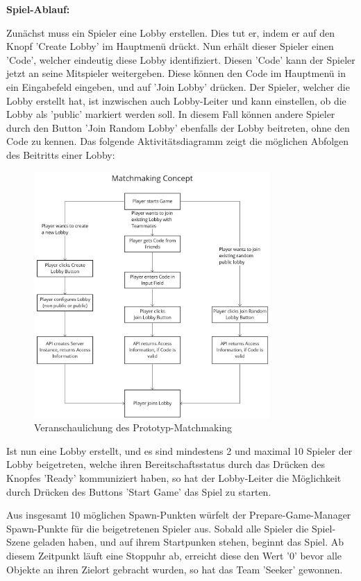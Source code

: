 \textbf{Spiel-Ablauf:}

Zunächst muss ein Spieler eine Lobby erstellen. Dies tut er, indem er auf den Knopf 'Create Lobby' im Hauptmenü drückt. Nun erhält dieser Spieler einen 'Code', welcher eindeutig diese Lobby identifiziert. Diesen 'Code' kann der Spieler jetzt an seine Mitspieler weitergeben. Diese können den Code im Hauptmenü in ein Eingabefeld eingeben, und auf 'Join Lobby' drücken. Der Spieler, welcher die Lobby erstellt hat, ist inzwischen auch Lobby-Leiter und kann einstellen, ob die Lobby als 'public' markiert werden soll. In diesem Fall können andere Spieler durch den Button 'Join Random Lobby' ebenfalls der Lobby beitreten, ohne den Code zu kennen. Das folgende Aktivitätsdiagramm zeigt die möglichen Abfolgen des Beitritts einer Lobby:

\begin{figure}[H]
	\centering
	\includegraphics[width=90mm]{images/matchmaking_concept.jpg}
	\caption[Matchmaking-Konzept Diagramm]{Veranschaulichung des Prototyp-Matchmaking}
	\label{pic:matchmaking_concept}
\end{figure}

Ist nun eine Lobby erstellt, und es sind mindestens 2 und maximal 10 Spieler der Lobby beigetreten, welche ihren Bereitschaftsstatus durch das Drücken des Knopfes 'Ready' kommuniziert haben, so hat der Lobby-Leiter die Möglichkeit durch Drücken des Buttons 'Start Game' das Spiel zu starten.

Aus insgesamt 10 möglichen Spawn-Punkten würfelt der Prepare-Game-Manager Spawn-Punkte für die beigetretenen Spieler aus. Sobald alle Spieler die Spiel-Szene geladen haben, und auf ihrem Startpunken stehen, beginnt das Spiel. Ab diesem Zeitpunkt läuft eine Stoppuhr ab, erreicht diese den Wert '0' bevor alle Objekte an ihren Zielort gebracht wurden, so hat das Team 'Seeker' gewonnen.

